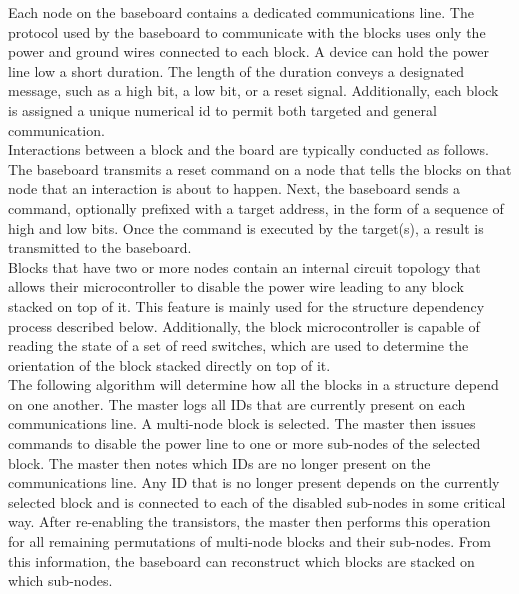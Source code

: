 Each node on the baseboard contains a dedicated communications line. The protocol used by the baseboard to communicate with the blocks uses only the power and ground wires connected to each block. A device can hold the power line low a short duration. The length of the duration conveys a designated message, such as a high bit, a low bit, or a reset signal. Additionally, each block is assigned a unique numerical id to permit both targeted and general communication.\\

Interactions between a block and the board are typically conducted as follows. The baseboard transmits a reset command on a node that tells the blocks on that node that an interaction is about to happen. Next, the baseboard sends a command, optionally prefixed with a target address, in the form of a sequence of high and low bits. Once the command is executed by the target(s), a result is transmitted to the baseboard.\\

Blocks that have two or more nodes contain an internal circuit topology that allows their microcontroller to disable the power wire leading to any block stacked on top of it. This feature is mainly used for the structure dependency process described below. Additionally, the block microcontroller is capable of reading the state of a set of reed switches, which are used to determine the orientation of the block stacked directly on top of it.\\

The following algorithm will determine how all the blocks in a structure depend on one another. The master logs all IDs that are currently present on each communications line. A multi-node block is selected. The master then issues commands to disable the power line to one or more sub-nodes of the selected block. The master then notes which IDs are no longer present on the communications line. Any ID that is no longer present depends on the currently selected block and is connected to each of the disabled sub-nodes in some critical way. After re-enabling the transistors, the master then performs this operation for all remaining permutations of multi-node blocks and their sub-nodes. From this information, the baseboard can reconstruct which blocks are stacked on which sub-nodes.
